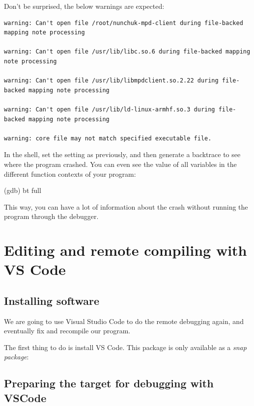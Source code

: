 Don't be surprised, the below warnings are expected:

{\small
\begin{verbatim}
warning: Can't open file /root/nunchuk-mpd-client during file-backed mapping note processing

warning: Can't open file /usr/lib/libc.so.6 during file-backed mapping note processing

warning: Can't open file /usr/lib/libmpdclient.so.2.22 during file-backed mapping note processing

warning: Can't open file /usr/lib/ld-linux-armhf.so.3 during file-backed mapping note processing

warning: core file may not match specified executable file.
\end{verbatim}
}

In the  shell, set the  setting as previously, and then
generate a backtrace to see where the program crashed.
You can even see the value of all variables in the different
function contexts of your program:

\begin{bashinput}
(gdb) bt full
\end{bashinput}

This way, you can have a lot of information about the crash
without running the program through the debugger.

\section{Editing and remote compiling with VS Code}

\subsection{Installing software}

We are going to use Visual Studio Code to do the remote debugging
again, and eventually fix and recompile our program.

The first thing to do is install VS Code. This package is only available
as a {\em snap package}:


\subsection{Preparing the target for debugging with VSCode}

